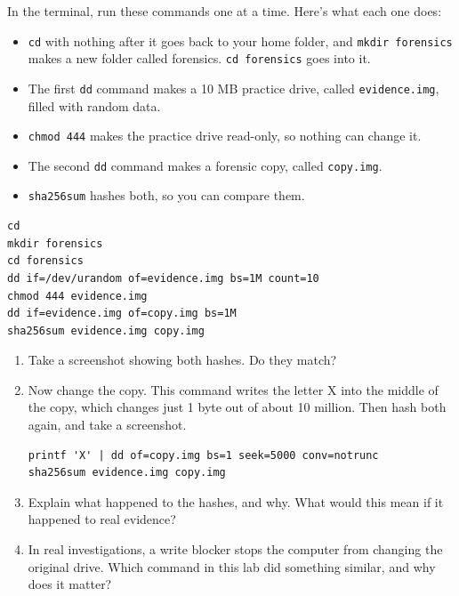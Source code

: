 \documentclass[12pt]{article}
\begin{document}
In the terminal, run these commands one at a time. Here's what each one does:
\begin{itemize}
    \item \texttt{cd} with nothing after it goes back to your home folder, and \texttt{mkdir forensics} makes a new folder called forensics. \texttt{cd forensics} goes into it.
    \item The first \texttt{dd} command makes a 10 MB practice drive, called \texttt{evidence.img}, filled with random data.
    \item \texttt{chmod 444} makes the practice drive read-only, so nothing can change it.
    \item The second \texttt{dd} command makes a forensic copy, called \texttt{copy.img}.
    \item \texttt{sha256sum} hashes both, so you can compare them.
\end{itemize}
\begin{Verbatim}
cd
mkdir forensics
cd forensics
dd if=/dev/urandom of=evidence.img bs=1M count=10
chmod 444 evidence.img
dd if=evidence.img of=copy.img bs=1M
sha256sum evidence.img copy.img
\end{Verbatim}
\begin{enumerate}[start=6]
    \item Take a screenshot showing both hashes. Do they match?
    \item Now change the copy. This command writes the letter X into the middle of the copy, which changes just 1 byte out of about 10 million. Then hash both again, and take a screenshot.
\begin{Verbatim}
printf 'X' | dd of=copy.img bs=1 seek=5000 conv=notrunc
sha256sum evidence.img copy.img
\end{Verbatim}
    \item Explain what happened to the hashes, and why. What would this mean if it happened to real evidence?
    \item In real investigations, a write blocker stops the computer from changing the original drive. Which command in this lab did something similar, and why does it matter?
\end{enumerate}
\end{document}
